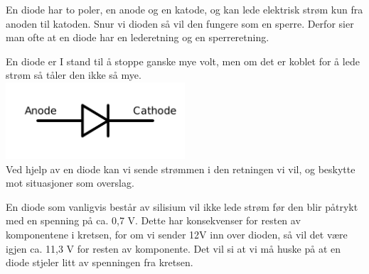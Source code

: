 En diode har to poler, en anode og en katode,
og kan lede elektrisk strøm kun fra anoden til katoden.
Snur vi dioden så vil den fungere som en sperre.
Derfor sier man ofte at en diode har en lederetning og en sperreretning.

En diode er I stand til å stoppe ganske mye volt,
men om det er koblet for å lede strøm så tåler den ikke så mye.
\\
\includegraphics[width=0.5\textwidth]{./img/diode-symbol}
\\

Ved hjelp av en diode kan vi sende strømmen i den retningen vi vil,
og beskytte mot situasjoner som overslag.

En diode som vanligvis består av silisium
vil ikke lede strøm før den blir påtrykt med en spenning på ca. 0,7 V.
Dette har konsekvenser for resten av komponentene i kretsen,
for om vi sender 12V inn over dioden,
så vil det være igjen ca. 11,3 V for resten av komponente.
Det vil si at vi må huske på at
en diode stjeler litt av spenningen fra kretsen.
